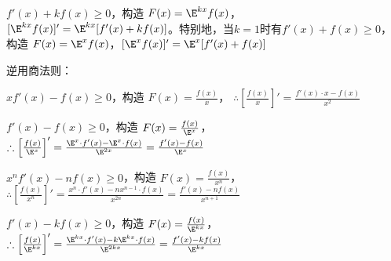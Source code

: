 $f'(x) + k f(x) \geq 0$，构造 $F(x) = \E^{kx} f(x)$，$[\E^{kx} f(x)]' = \E^{kx} [f'(x) + kf(x)]$。特别地，当$k=1$时有$f'(x) + f(x) \geq 0$，构造 $F(x) = \E^x f(x)$，$[\E^x f(x)]' = \E^x [f'(x) + f(x)]$

逆用商法则：

$xf'(x) - f(x) \geq 0$，构造 $F(x) = \frac{f(x)}{x}$，  
    $\therefore \left[\frac{f(x)}{x}\right]' = \frac{f'(x) \cdot x - f(x)}{x^2}$

$f'(x) - f(x) \geq 0$，构造 $F(x) = \frac{f(x)}{\E^x}$，  
    $\therefore \left[\frac{f(x)}{\E^x}\right]' = \frac{\E^x \cdot f'(x) - \E^x \cdot f(x)}{\E^{2x}} = \frac{f'(x) - f(x)}{\E^x}$

$x^n f'(x) - n f(x) \geq 0$，构造 $F(x) = \frac{f(x)}{x^n}$，  
    $\therefore \left[\frac{f(x)}{x^n}\right]' = \frac{x^n \cdot f'(x) - n x^{n-1} \cdot f(x)}{x^{2n}} = \frac{f'(x) - n f(x)}{x^{n+1}}$

$f'(x) - k f(x) \geq 0$，构造 $F(x) = \frac{f(x)}{\E^{kx}}$，  
    $\therefore \left[\frac{f(x)}{\E^{kx}}\right]' = \frac{\E^{kx} \cdot f'(x) - k \E^{kx} \cdot f(x)}{\E^{2kx}} = \frac{f'(x) - k f(x)}{\E^{kx}}$
